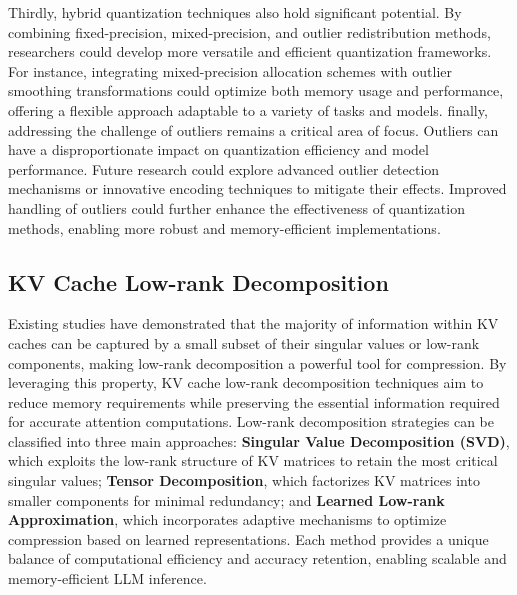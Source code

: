 Thirdly,
hybrid quantization techniques also hold significant potential. By combining fixed-precision, mixed-precision, and outlier redistribution methods, researchers could develop more versatile and efficient quantization frameworks. For instance, integrating mixed-precision allocation schemes with outlier smoothing transformations could optimize both memory usage and performance, offering a flexible approach adaptable to a variety of tasks and models.
finally, addressing the challenge of outliers remains a critical area of focus. Outliers can have a disproportionate impact on quantization efficiency and model performance. Future research could explore advanced outlier detection mechanisms or innovative encoding techniques to mitigate their effects. Improved handling of outliers could further enhance the effectiveness of quantization methods, enabling more robust and memory-efficient implementations.




\subsection{KV Cache Low-rank Decomposition}\label{ssec:kv_low_rank}
Existing studies have demonstrated that the majority of information within KV caches can be captured by a small subset of their singular values or low-rank components, making low-rank decomposition a powerful tool for compression. 
By leveraging this property, KV cache low-rank decomposition techniques aim to reduce memory requirements while preserving the essential information required for accurate attention computations.
Low-rank decomposition strategies can be classified into three main approaches: \textbf{Singular Value Decomposition (SVD)}, which exploits the low-rank structure of KV matrices to retain the most critical singular values; 
\textbf{Tensor Decomposition}, which factorizes KV matrices into smaller components for minimal redundancy; 
and \textbf{Learned Low-rank Approximation}, which incorporates adaptive mechanisms to optimize compression based on learned representations. 
Each method provides a unique balance of computational efficiency and accuracy retention, enabling scalable and memory-efficient LLM inference.



